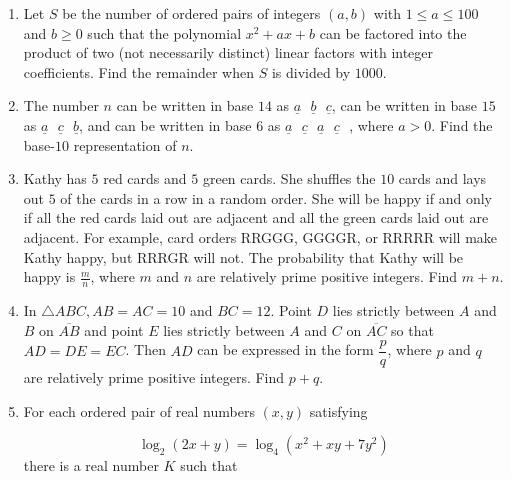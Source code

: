 \documentclass{article}
\begin{document}
\begin{enumerate}[label=\arabic*., itemsep=0.5em]
\item Let \(S\) be the number of ordered pairs of integers \((a,b)\) with \(1 \leq a \leq 100\) and \(b \geq 0\) such that the polynomial \(x^2+ax+b\) can be factored into the product of two (not necessarily distinct) linear factors with integer coefficients. Find the remainder when \(S\) is divided by \(1000\).\par \vspace{0.5em}\item The number \(n\) can be written in base \(14\) as \(\underline{a}\text{ }\underline{b}\text{ }\underline{c}\), can be written in base \(15\) as \(\underline{a}\text{ }\underline{c}\text{ }\underline{b}\), and can be written in base \(6\) as \(\underline{a}\text{ }\underline{c}\text{ }\underline{a}\text{ }\underline{c}\text{ }\), where \(a > 0\). Find the base-\(10\) representation of \(n\).\par \vspace{0.5em}\item Kathy has \(5\) red cards and \(5\) green cards. She shuffles the \(10\) cards and lays out \(5\) of the cards in a row in a random order. She will be happy if and only if all the red cards laid out are adjacent and all the green cards laid out are adjacent. For example, card orders RRGGG, GGGGR, or RRRRR will make Kathy happy, but RRRGR will not. The probability that Kathy will be happy is \( \frac{m}{n}\), where \(m\) and \(n\) are relatively prime positive integers. Find \(m + n\).\par \vspace{0.5em}\item In \(\triangle ABC, AB = AC = 10\) and \(BC = 12\). Point \(D\) lies strictly between \(A\) and \(B\) on \(\overline{AB}\) and point \(E\) lies strictly between \(A\) and \(C\) on \(\overline{AC}\) so that \(AD = DE = EC\). Then \(AD\) can be expressed in the form \(\dfrac{p}{q}\), where \(p\) and \(q\) are relatively prime positive integers. Find \(p+q\).\par \vspace{0.5em}\item For each ordered pair of real numbers \((x,y)\) satisfying

\begin{equation*}
\log_2(2x+y) = \log_4(x^2+xy+7y^2)
\end{equation*}
there is a real number \(K\) such that


\end{enumerate}
\end{document}
